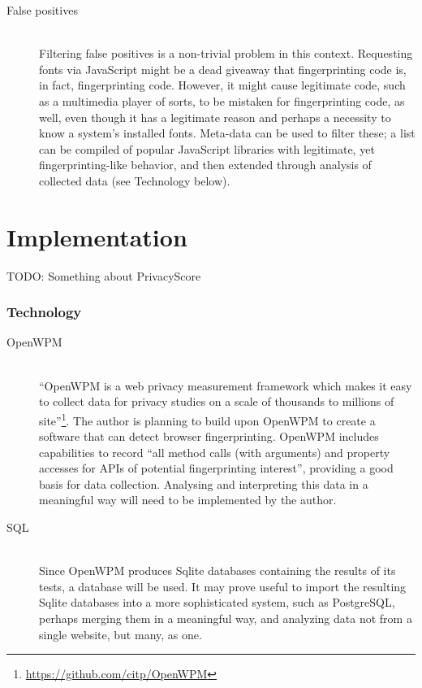 \documentclass[a4paper, 12pt]{scrreprt}
\begin{document}
\begin{description}
        \item[False positives] \hfill \\
            Filtering false positives is a non-trivial problem in this context. Requesting fonts via JavaScript might be a dead giveaway
            that fingerprinting code is, in fact, fingerprinting code. However, it might cause legitimate code, such
            as a multimedia player of sorts, to be mistaken for fingerprinting code, as well, even though it has a legitimate
            reason and perhaps a necessity to know a system's installed fonts.
            Meta-data can be used to filter these; a list can be compiled of popular JavaScript libraries with legitimate,
            yet fingerprinting-like behavior, and then extended through analysis of collected data (see Technology below).
    \end{description}

\chapter{Implementation}
TODO: Something about PrivacyScore

    \subsection{Technology}

    \begin{description}
        \item[OpenWPM] \hfill \\
            ``OpenWPM is a web privacy measurement framework which makes it easy to collect data for privacy studies on a scale
            of thousands to millions of site''\footnote{\url{https://github.com/citp/OpenWPM}}.
            The author is planning to build upon OpenWPM\cite{englehardt2016census} to create a software that can detect
            browser fingerprinting. OpenWPM includes capabilities to record
            ``all method calls (with arguments) and property accesses for APIs of potential fingerprinting interest'',
            providing a good basis for data collection. Analysing and interpreting this data in a meaningful way
            will need to be implemented by the author.

        \item[SQL] \hfill \\
            Since OpenWPM produces Sqlite databases containing the results of its tests, a database will be used. It may prove useful
            to import the resulting Sqlite databases into a more sophisticated system, such as PostgreSQL, perhaps merging them in a
            meaningful way, and analyzing data not from a single website, but many, as one.
    \end{description}

\clearpage

\printbibliography
\end{document}
